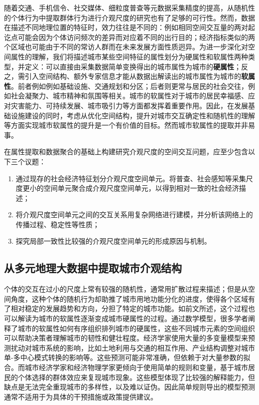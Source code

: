 随着交通、手机信令、社交媒体、细粒度普查等元数据采集精度的提高，从随机性的个体行为中提取群体行为进行介观尺度的研究也有了足够的可行性。然而，数据在描述不同地理位置的特征时，效力往往是不同的：例如相同空间交互量的两对起讫点可能会因为个体访问频次的差异而对应着不同的出行目的\cite{dong2020spectral}；经济指标类似的两个区域也可能由于不同的常访人群而在未来发展方面性质迥异\cite{mantymaa2018integrating}。为进一步深化对空间属性的理解，我们将描述城市某些空间特征的属性划分为硬属性和软属性两种类型，并定义：可以直接由采集数据简单变换得出的城市属性为城市的\textbf{硬属性}；反之，需引入空间结构、额外专家信息才能从数据出解读出的城市属性为城市的\textbf{软属性}。前者例如例如基础设施、交通规划和分区；后者则更常与居民的社会交往，例如社会凝聚力、城市精神和氛围等相关\cite{barter2019manifold}。城市的软属性对于城市的居民幸福感、应对灾害能力、可持续发展、城市吸引力等方面都发挥着重要作用。因此，在发展基础设施建设的同时，考虑从优化空间结构，提升对城市交互确定性和随机性的理解等方面实现城市软属性的提升是一个有价值的目标。然而城市软属性的提取并非易事\cite{kim2014perceived,begg1999cities,fujita1999spatial}。

在属性提取和数据聚合的基础上构建研究介观尺度的空间交互问题，应至少包含以下三个议题：
\begin{enumerate}
    \item 通过现存的社会经济特征划分介观尺度空间单元。将普查、社会感知等采集尺度更小的空间单元聚合成介观尺度空间单元，以得到相对一致的社会经济描述；
    \item 将介观尺度空间单元之间的交互关系用复杂网络进行建模，并分析该网络上的传播过程、稳定性等性质；
    \item 探究局部一致性比较强的介观尺度空间单元的形成原因与机制。
\end{enumerate}

\subsection{从多元地理大数据中提取城市介观结构}

个体的交互在过小的尺度上常有较强的随机性，通常用扩散过程来描述\cite{helbing1995social}；但是从空间角度，这种个体的随机行为却助推了城市用地功能分化的进度，使得各个区域有了相对稳定的发展趋势和方向，分担了特定的城市功能\cite{louf2013modeling}。如前文所述，这个过程也可以解读为城市的软属性逐渐变成城市硬属性的过程。通过数学模型，很多学者阐释了城市的软属性如何有序组织排列城市的硬属性，这些不同城市元素的空间组织可以帮助决策者理解城市的韧性和健壮程度\cite{batty1971modelling, louf2013modeling}。经济学家使用大量的多变量模型来预测扰动对城市系统的影响，比如土地利用与交通的相互作用、产业结构调整对城市单-多中心模式转换的影响等\cite{fujita1982multiple, acheampong2015land}。这些预测可能非常准确，但依赖于对大量参数的拟合。而城市经济学家和经济物理学家更倾向于使用简单的规则和变量，基于城市居民的个体选择的群体效应来复现城市现象。这些模型体现了比较强的解释能力，但缺点是无法完全重现城市的多样性，以及难以证伪。因此简单规则导出的模型预测通常不适用于为具体的干预措施或政策提供建议。

